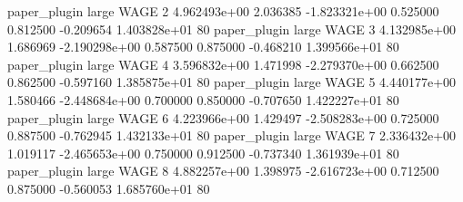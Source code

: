        paper_plugin      large     WAGE                 2 4.962493e+00      2.036385 -1.823321e+00 0.525000 0.812500      -0.209654 1.403828e+01 80
       paper_plugin      large     WAGE                 3 4.132985e+00      1.686969 -2.190298e+00 0.587500 0.875000      -0.468210 1.399566e+01 80
       paper_plugin      large     WAGE                 4 3.596832e+00      1.471998 -2.279370e+00 0.662500 0.862500      -0.597160 1.385875e+01 80
       paper_plugin      large     WAGE                 5 4.440177e+00      1.580466 -2.448684e+00 0.700000 0.850000      -0.707650 1.422227e+01 80
       paper_plugin      large     WAGE                 6 4.223966e+00      1.429497 -2.508283e+00 0.725000 0.887500      -0.762945 1.432133e+01 80
       paper_plugin      large     WAGE                 7 2.336432e+00      1.019117 -2.465653e+00 0.750000 0.912500      -0.737340 1.361939e+01 80
       paper_plugin      large     WAGE                 8 4.882257e+00      1.398975 -2.616723e+00 0.712500 0.875000      -0.560053 1.685760e+01 80
